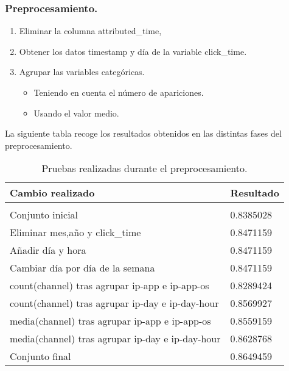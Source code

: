 \documentclass{beamer}
\theoremstyle{plain}
\theoremstyle{definition}
\theoremstyle{plain}
\theoremstyle{definition}
\theoremstyle{remark}
\theoremstyle{definition}
\begin{document}
\begin{frame}
	\frametitle{Preprocesamiento.}
	\begin{enumerate}
		\item Eliminar la columna attributed\_time,
		\item Obtener los datos timestamp y día de la variable click\_time.
		\item Agrupar las variables categóricas.
		\begin{itemize}
			\item Teniendo en cuenta el número de apariciones.
			\item Usando el valor medio.
		\end{itemize}
\end{enumerate}
\end{frame}
\begin{frame}
	La siguiente tabla recoge los resultados obtenidos en las distintas fases del preprocesamiento.
	\begin{table}[H]
		\centering
		
		\begin{tabular}{ll}
			\textbf{Cambio realizado}& \textbf{Resultado} \\
			\hline
			\\
			Conjunto inicial& 0.8385028     \\
			Eliminar mes,año y click\_time& 0.8471159  \\
			Añadir día y hora&  0.8471159 \\
			Cambiar día por día de la semana & 0.8471159\\
			count(channel) tras agrupar ip-app e ip-app-os & 0.8289424 \\
			count(channel) tras agrupar ip-day e ip-day-hour & 0.8569927 \\
			media(channel) tras agrupar ip-app e ip-app-os & 0.8559159 \\
			media(channel) tras agrupar ip-day e ip-day-hour & 0.8628768 \\
			Conjunto final & 0.8649459
		\end{tabular}
		\caption{Pruebas realizadas durante el preprocesamiento.}
	\end{table}
\end{frame}
\end{document}
